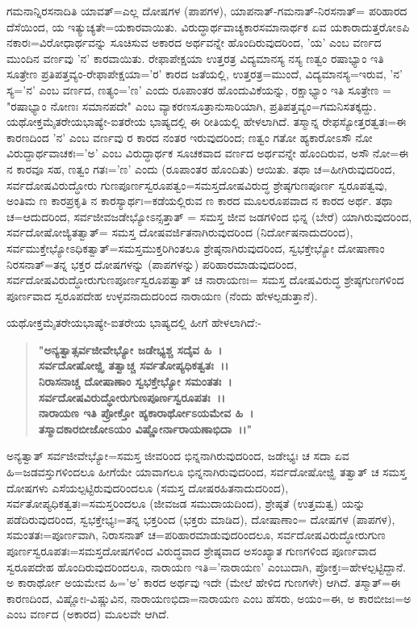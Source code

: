 ಗಮನಾನ್ನಿರಸನಾದಿತಿ ಯಾವತ್=ಎಲ್ಲ ದೋಷಗಳ (ಪಾಪಗಳ), ಯಾಪ\-ನಾತ್-ಗಮನಾತ್-ನಿರಸನಾತ್= ಪರಿಹಾರದ ದೆಸೆಯಿಂದ, ಯ ಇತ್ಯುಚ್ಯತೇ=ಯಕಾರ\-ವಾಯಿತು. ವಿರುದ್ಧಾರ್ಥವಾಚ್ಯಕಾರಸಮಾನಾರ್ಥಕ ಏವ ಯಕಾರಾದುತ್ತರೋಽಪಿ ನಕಾರಃ=\break ವಿರೋಧಾರ್ಥವನ್ನು ಸೂಚಿಸುವ ಅಕಾರದ ಅರ್ಥವನ್ನೇ ಹೊಂದಿರುವುದರಿಂದ, 'ಯ' ಎಂಬ ವರ್ಣದ ಮುಂದಿನ ವರ್ಣವು 'ನ' ಕಾರವಾಯಿತು. ರೇಫಾಪೇಕ್ಷಯಾ ಉತ್ತರತ್ರ ವಿದ್ಯ\-ಮಾನಸ್ಯ ನಸ್ಯ ಣತ್ವಂ ರಷಾಭ್ಯಾಂ ಇತಿ ಸೂತ್ರೇಣ ಪ್ರತಿಪತ್ತವ್ಯಂ-ರೇಫಾಪೇಕ್ಷಯಾ='ರ' ಕಾರದ ಜತೆಯಲ್ಲಿ, ಉತ್ತರತ್ರ=ಮುಂದೆ, ವಿದ್ಯಮಾನಸ್ಯ=ಇರುವ, 'ನ' ಸ್ಯ='ನ' ಎಂಬ ವರ್ಣದ, ಣತ್ಯಂ='ಣ' ಎಂದು ರೂಪಾಂತರ ಹೊಂದುವಿಕೆಯನ್ನು, ರಕ್ಷಾಭ್ಯಾಂ ಇತಿ ಸೂತ್ರೇಣ = "ರಷಾಭ್ಯಾಂ ನೋಣಃ ಸಮಾನಪದೇ" ಎಂಬ ವ್ಯಾಕರಣಸೂತ್ರಾನುಸಾರಿಯಾಗಿ, ಪ್ರತಿ\-ಪತ್ತವ್ಯಂ=ಗಮನಿಸತಕ್ಕದ್ದು. ಯಥೋಕ್ತಮೈತರೇಯಭಾಷ್ಯೇ-ಐತರೇಯ ಭಾಷ್ಯದಲ್ಲಿ ಈ ರೀತಿಯಲ್ಲಿ ಹೇಳಲಾಗಿದೆ. ತಸ್ಮಾನ್ನ ರೇಫಸ್ಯೋತ್ತರತ್ವತಃ=ಈ ಕಾರಣದಿಂದ 'ನ' ಎಂಬ ವರ್ಣವು ರ ಕಾರದ ನಂತರ ಇರುವುದರಿಂದ; ಣತ್ವಂ ಗತೋ ಹ್ಯಕಾರೋಽಸೌ ನೋ ವಿರುದ್ದಾರ್ಥವಾಚಕಃ='ಅ' ಎಂಬ ವಿರುದ್ಧಾರ್ಥಕ ಸೂಚಕವಾದ ವರ್ಣದ ಅರ್ಥವನ್ನೇ ಹೊಂದಿರುವ, ಅಸೌ ನೋ=ಈ ನ ಕಾರವೂ ಸಹ, ಣತ್ವಂ ಗತಃ='ಣ' ಎಂದು (ರೂಪಾಂತರ ಹೊಂದಿತು) ಆಯಿತು. ತಥಾ ಚ=ಹೀಗಿರುವುದರಿಂದ, ಸರ್ವದೋಷವಿರುದ್ಧೋರು ಗುಣ\-ಪೂರ್ಣಸ್ವರೂಪತ್ವಂ=ಸಮಸ್ತದೋಷವಿರುದ್ಧ ಶ್ರೇಷ್ಠಗುಣಪೂರ್ಣ ಸ್ವರೂಪತ್ವವು, ಅಂತಿಮ ಣ ಕಾರಪ್ರಕೃತಿ ನ ಕಾರಸ್ಯಾರ್ಥಃ=ಕಡೆಯಲ್ಲಿರುವ ಣ ಕಾರದ ಮೂಲರೂಪವಾದ ನ ಕಾರದ ಅರ್ಥ. ತಥಾ ಚ=ಆದುದರಿಂದ, ಸರ್ವಜೀವಜಡೇಭ್ಯೋಽನ್ಸತ್ತಾತ್ = ಸಮಸ್ತ ಜೀವ ಜಡಗಳಿಂದ ಭಿನ್ನ (ಬೇರೆ) ಯಾಗಿರುವುದರಿಂದ, ಸರ್ವದೋಷೋಜ್ಯಿತತ್ವಾತ್= ಸಮಸ್ತ ದೋಷವರ್ಜಿತನಾಗಿರುವುದರಿಂದ (ನಿರ್ದೋಷನಾದುದರಿಂದ), ಸರ್ವಮುಕ್ತೇಭ್ಯೋಽಧಿಕತ್ವಾತ್=ಸಮಸ್ತಮುಕ್ತರಿಗಿಂತಲೂ ಶ್ರೇಷ್ಠನಾಗಿರುವುದರಿಂದ, ಸ್ವಭಕ್ತೇಭ್ಯೋ ದೋಷಾಣಾಂ ನಿರಸ\-ನಾತ್=ತನ್ನ ಭಕ್ತರ ದೋಷಗಳನ್ನು (ಪಾಪಗಳನ್ನು) ಪರಿಹಾರಮಾಡುವುದರಿಂದ, ಸರ್ವದೋಷವಿರುದ್ಧೋರುಗುಣಪೂರ್ಣಸ್ವರೂಪತ್ವಾತ್ ಚ ನಾರಾಯಣಃ= ಸಮಸ್ತ ದೋಷವಿರುದ್ಧ ಶ್ರೇಷ್ಠಗುಣಗಳಿಂದ ಪೂರ್ಣವಾದ ಸ್ವರೂಪದೇಹ ಉಳ್ಳವನಾದುದರಿಂದ ನಾರಾಯಣ (ನೆಂದು ಹೇಳಲ್ಪಡುತ್ತಾನೆ).

ಯಥೋಕ್ತಮೈತರೇಯಭಾಷ್ಯೇ-ಐತರೇಯ ಭಾಷ್ಯದಲ್ಲಿ ಹೀಗೆ ಹೇಳಲಾಗಿದೆ:-

\begin{verse}
\textbf{"ಅನ್ಯತ್ವಾತ್ಸರ್ವಜೀವೇಭ್ಯೋ ಜಡೇಭ್ಯಶ್ಚ ಸದೈವ ಹಿ~।}\\\textbf{ಸರ್ವದೋಷೋಜ್ಝಿ ತತ್ವಾಚ್ಚ ಸರ್ವತೋಪ್ಯಧಿಕತ್ವತಃ~।।}\\\textbf{ನಿರಾಸನಾಚ್ಚ ದೋಷಾಣಾಂ ಸ್ವಭಕ್ತೇಭ್ಯೋ ಸಮಂತತಃ~।}\\\textbf{ಸರ್ವದೋಷವಿರುದ್ಧೋರುಗುಣಪೂರ್ಣಸ್ವರೂಪತಃ~।।}\\\textbf{ನಾರಾಯಣ ಇತಿ ಪ್ರೋಕ್ತೋ ಹ್ಯಕಾರಾರ್ಥೋಽಯಮೇವ ಹಿ~।}\\\textbf{ತಸ್ಮಾದಕಾರಬೀಜೋಽಯಂ ವಿಷ್ಣೋರ್ನಾರಾಯಣಾಭಿದಾ~।।"}
\end{verse}

ಅನ್ಯತ್ವಾತ್ ಸರ್ವಜೀವೇಭ್ಯೋ=ಸಮಸ್ತ ಜೀವರಿಂದ ಭಿನ್ನನಾಗಿರುವುದರಿಂದ, ಜಡೇಭ್ಯಃ ಚ ಸದಾ ಏವ ಹಿ=ಜಡವಸ್ತುಗಳಿಂದಲೂ ಹೀಗೆಯೇ ಯಾವಾಗಲೂ ಭಿನ್ನನಾಗಿರುವುದರಿಂದ, ಸರ್ವದೋಷೋಜ್ಝಿ ತತ್ವಾತ್ ಚ ಸಮಸ್ತ ದೋಷಗಳು ಎಸೆಯಲ್ಪಟ್ಟಿರುವುದರಿಂದಲೂ (ಸಮಸ್ತ ದೋಷರಹಿತನಾದುದರಿಂದ), ಸರ್ವತೋಪ್ಯಧಿಕತ್ವತಃ=ಸಮಸ್ತರಿಂದಲೂ (ಜೀವಜಡ ಸಮುದಾಯದಿಂದ), ಶ್ರೇಷ್ಠತೆ (ಉತ್ತಮತ್ವ) ಯನ್ನು ಪಡೆದಿರುವುದರಿಂದ, ಸ್ವಭಕ್ತೇಭ್ಯಃ=ತನ್ನ ಭಕ್ತರಿಂದ (ಭಕ್ತರು ಮಾಡಿದ), ದೋಷಾಣಾಂ= ದೋಷಗಳ (ಪಾಪಗಳ), ಸಮಂತತಃ=ಪೂರ್ಣ\-ವಾಗಿ, ನಿರಾಸನಾತ್ ಚ=ಪರಿಹಾರಮಾಡುವುದರಿಂದಲೂ, ಸರ್ವದೋಷವಿರುದ್ಧೋರುಗುಣ ಪೂರ್ಣಸ್ವರೂಪತಃ=ಸಮಸ್ತದೋಷಗಳಿಂದ ವಿರುದ್ಧವಾದ ಶ್ರೇಷ್ಠವಾದ ಅಸಂಖ್ಯಾತ ಗುಣಗಳಿಂದ ಪೂರ್ಣವಾದ ಸ್ವರೂಪದೇಹ ಹೊಂದಿರುವುದರಿಂದಲೂ, ನಾರಾಯಣ ಇತಿ=\break 'ನಾರಾಯಣ' ಎಂಬುದಾಗಿ, ಪ್ರೋಕ್ತಃ=ಹೇಳಲ್ಪಟ್ಟಿದ್ದಾನೆ. ಅ ಕಾರಾರ್ಥೋ ಅಯಮೇವ ಹಿ='ಅ' ಕಾರದ ಅರ್ಥವು ಇದೇ (ಮೇಲೆ ಹೇಳಿದ ಗುಣಗಳೇ) ಆಗಿದೆ. ತಸ್ಮಾತ್=ಈ ಕಾರಣದಿಂದ, ವಿಷ್ಣೋಃ-ವಿಷ್ಣುವಿನ, ನಾರಾಯಣಭಿದಾ=ನಾರಾಯಣ ಎಂಬ ಹೆಸರು, ಅಯಂ=ಈ, ಅ ಕಾರಬೀಜಃ=ಅ ಎಂಬ ವರ್ಣದ (ಅಕಾರದ) ಮೂಲವೇ ಆಗಿದೆ.

